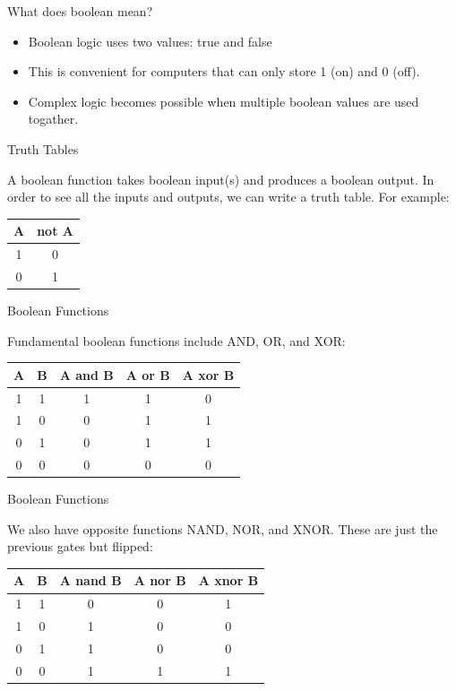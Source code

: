 

\begin{frame}{What does boolean mean?}
	\begin{itemize}
		\item Boolean logic uses two values: true and false
		\item This is convenient for computers that can only store 1 (on) and 0 (off).
		\item Complex logic becomes possible when multiple boolean values are used togather.
	\end{itemize}
\end{frame}


\begin{frame}{Truth Tables}

	A boolean function takes boolean input(s) and produces a boolean output. In order to see all the inputs and outputs, we can write a truth table. For example:

	\begin{tabular}{c c}
		A & not A \\
		\hline
		1 & 0     \\
		0 & 1
	\end{tabular}
\end{frame}


\begin{frame}{Boolean Functions}

	Fundamental boolean functions include AND, OR, and XOR:

	\begin{tabular}{c c c c c}
		A & B & A and B & A or B & A xor B \\
		\hline
		1 & 1 & 1       & 1      & 0       \\
		1 & 0 & 0       & 1      & 1       \\
		0 & 1 & 0       & 1      & 1       \\
		0 & 0 & 0       & 0      & 0
	\end{tabular}
\end{frame}

\begin{frame}{Boolean Functions}

	We also have opposite functions NAND, NOR, and XNOR. These are just the previous gates but flipped:

	\begin{tabular}{c c c c c}
		A & B & A nand B & A nor B & A xnor B \\
		\hline
		1 & 1 & 0        & 0       & 1        \\
		1 & 0 & 1        & 0       & 0        \\
		0 & 1 & 1        & 0       & 0        \\
		0 & 0 & 1        & 1       & 1
	\end{tabular}



\end{frame}

